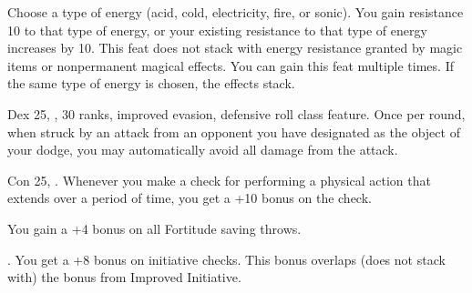 {}{}
{Choose a type of energy (acid, cold, electricity, fire, or sonic). You gain resistance 10 to that type of energy, or your existing resistance to that type of energy increases by 10. This feat does not stack with energy resistance granted by magic items or nonpermanent magical effects.}
{}{You can gain this feat multiple times. If the same type of energy is chosen, the effects stack.}

{Dex 25, ,  30 ranks, improved evasion, defensive roll class feature.}
{Once per round, when struck by an attack from an opponent you have designated as the object of your dodge, you may automatically avoid all damage from the attack.}

{Con 25, .}
{Whenever you make a check for performing a physical action that extends over a period of time, you get a +10 bonus on the check.}

{}{You gain a +4 bonus on all Fortitude saving throws.}

{.}
{You get a +8 bonus on initiative checks. This bonus overlaps (does not stack with) the bonus from Improved Initiative.}

